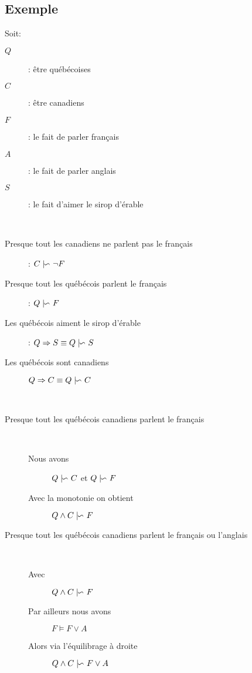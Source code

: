 \subsection{Exemple}
Soit:
\begin{description}
\item[$Q$] : être québécoises 
\item[$C$] : être canadiens
\item[$F$] : le fait de parler français 
\item[$A$] : le fait de parler anglais 
\item[$S$] : le fait d'aimer le sirop d'érable
\end{description}
\ \\
\begin{description}
\item[Presque tout les canadiens ne parlent pas le français]: $C \mid\kern-0.40em{\backsim}\  \neg F$
\item[Presque tout les québécois parlent le français]: $Q \mid\kern-0.40em{\backsim}\  F$
\item[Les québécois aiment le sirop d'érable]: $Q \Rightarrow S \equiv Q \mid\kern-0.40em{\backsim}\  S$
\item[Les québécois sont canadiens] $Q \Rightarrow C \equiv Q \mid\kern-0.40em{\backsim}\  C$
\end{description}
\ \\
\begin{description}
\item[Presque tout les québécois canadiens parlent le français]\ 
\begin{description}
\item[Nous avons] $Q \mid\kern-0.40em{\backsim}\  C$ et $Q \mid\kern-0.40em{\backsim}\  F$
\item[Avec la monotonie on obtient] $Q \wedge C \mid\kern-0.40em{\backsim}\  F$
\end{description}
\item[Presque tout les québécois canadiens parlent le français ou l'anglais]\ 
\begin{description}
\item[Avec] $Q \wedge C \mid\kern-0.40em{\backsim}\  F$
\item[Par ailleurs nous avons] $F \models F \vee A$
\item[Alors via l'équilibrage à droite] $Q \wedge C \mid\kern-0.40em{\backsim}\  F \vee A$
\end{description}
\end{description}

